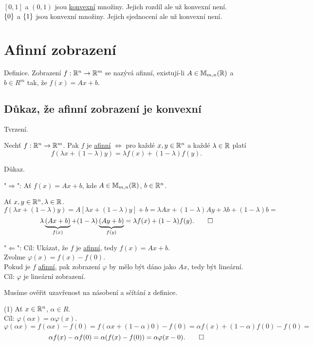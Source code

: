 $[0,1]$ a $(0,1)$ jsou \hyperref[sec:konvex]{konvexní} množiny. Jejich rozdíl ale už konvexní není.\\
$\left\lbrace 0 \right\rbrace$ a $\left\lbrace 1 \right\rbrace$ jsou konvexní množiny. Jejich sjednocení ale už konvexní není.

\section*{Afinní zobrazení} \label{sec:afin}
Definice. Zobrazení $f: \mathbb{R}^n \rightarrow \mathbb{R}^m$ se nazývá afinní, existují-li $A \in \mathbb{M}_{m,n} (\mathbb{R})$ a $b \in R^m$
tak, že $f(x) = Ax + b$. 

\subsection{Důkaz, že afinní zobrazení je konvexní}
Tvrzení. 

Nechť $f: \mathbb{R}^n \rightarrow \mathbb{R}^m$. Pak $f$ je \hyperref[sec:afin]{afinní} $\iff$ pro každé $x,y \in \mathbb{R}^n$ a každé 
$\lambda \in \mathbb{R}$ platí
\[f(\lambda x + (1-\lambda) y) =\lambda f(x) + (1-\lambda) f(y)\text{.}\]

Důkaz.

"$\Rightarrow$": Ať $f(x) = Ax + b$, kde $A \in \mathbb{M}_{m,n} (\mathbb{R})$, $b \in \mathbb{R}^n$.

Ať $x, y \in \mathbb{R}^n, \lambda \in \mathbb{R}$.
\[
    f(\lambda x + (1 - \lambda) y) = A [\lambda x + (1-\lambda) y] + b = \lambda A x + (1-\lambda)Ay + \lambda b + 
    (1-\lambda)b = 
\] 
\[ 
    \lambda \underbrace{(Ax + b)}_{f(x)} + (1-\lambda)\underbrace{(Ay + b)}_{f(y)} = \lambda f(x) + (1-\lambda)f(y). \qed
\]

"$\Leftarrow$": 
Cíl: Ukázat, že $f$ je \hyperref[sec:afin]{afinní}, tedy $f(x) = Ax + b$.\\
Zvolme $\varphi(x) = f(x) - f(0)$.\\
Pokud je $f$ \hyperref[sec:afin]{afinní}, pak zobrazení $\varphi$ by mělo být dáno jako $Ax$, tedy být lineární.\\
Cíl: $\varphi$ je lineární zobrazení.

Musíme ověřit uzavřenost na násobení a sčítání z definice.

(1) Ať $x \in \mathbb{R}^n$, $\alpha \in R$.\\
Cíl: $\varphi(\alpha x) = \alpha \varphi(x)$.
\[
    \varphi(\alpha x) = f(\alpha x) - f(0) = f(\alpha x + (1-\alpha)0) - f(0) = \alpha f(x) + (1-\alpha)f(0) - f(0) =
\]
\[
    \alpha f(x) - \alpha f(0) = \alpha (f(x) - f(0)) = \alpha \varphi (x-0). \qed
\]

